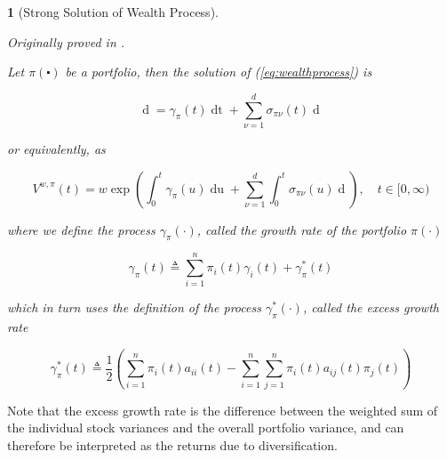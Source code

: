 \documentclass[british]{amsart}
\numberwithin{equation}{section}
\numberwithin{figure}{section}
\theoremstyle{plain}
\theoremstyle{definition}
\theoremstyle{plain}
\theoremstyle{plain}
\theoremstyle{plain}
\newtheorem{prop}[thm]{\protect\propositionname}
\theoremstyle{remark}
\theoremstyle{plain}
\providecommand{\propositionname}{Proposition}
\renewcommand{\d}[1]{\mathop{\mathrm{d}{#1}}}
\newcommand{\ranget}{t\in[0,\infty)}
\newcommand{\defeq}{\mathop{\triangleq}}
\begin{document}
\begin{prop} [Strong Solution of Wealth Process]
\label{prop:solutionofwealthprocess}

  Originally proved in \cite{fernholz1999pgf}. 

  Let $\pi(\centerdot)$ be a portfolio, then the solution of
(\ref{eq:wealthprocess}) is

  \begin{equation} \label{eq:wealthprocess} \d{V^{w,\pi}(t)} =  \gamma_{\pi}(t)
\d{t} + \sum_{\nu=1}^{d} \sigma_{\pi\nu}(t) \d{W_{\nu}(t)} \end{equation}

  or equivalently, as

  \begin{equation} V^{w,\pi}(t) = w \exp{ \left( \int_{0}^{t} \gamma_{\pi}(u)
\d{u} + \sum_{\nu=1}^{d} \int_{0}^{t} \sigma_{\pi\nu}(u) \d{W_{\nu}(u)}
\right)}, \quad \ranget \end{equation}

  where we define the process $\gamma_{\pi}(\cdot)$, called the \textit{growth
rate} of the portfolio $\pi(\cdot)$

  \begin{equation} \label{eq:portfoliogamma} \gamma_{\pi}(t) \defeq
\sum_{i=1}^{n} \pi_{i}(t)\gamma_{i}(t) + \gamma_{\pi}^{*}(t) \end{equation}

  which in turn uses the definition of the process $\gamma_{\pi}^{*}(\cdot)$,
called the \textit{excess growth rate}

  \begin{equation} \gamma_{\pi}^{*}(t) \defeq \frac{1}{2} \left( \sum_{i=1}^{n}
\pi_{i}(t)a_{ii}(t) - \sum_{i=1}^{n} \sum_{j=1}^{n}
\pi_{i}(t)a_{ij}(t)\pi_{j}(t) \right) \end{equation}

\end{prop}

Note that the excess growth rate is the difference between the weighted sum of
the individual stock variances and the overall portfolio variance, and can
therefore be interpreted as the returns due to diversification.

\newcommand{\norm}[1]{\left\lVert#1\right\rVert}
\end{document}
